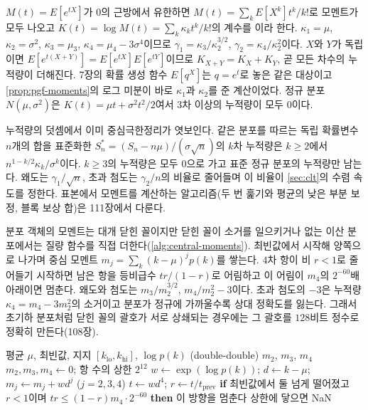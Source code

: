  $M(t)=E[e^{tX}]$가 $0$의 근방에서 유한하면 $M(t)=\sum_kE[X^k]t^k/k!$로 모멘트가 모두 나오고 $K(t)=\log M(t)=\sum_k\kappa_kt^k/k!$의 계수를 이라 한다. $\kappa_1=\mu$, $\kappa_2=\sigma^2$, $\kappa_3=\mu_3$, $\kappa_4=\mu_4-3\sigma^4$이므로 $\gamma_1=\kappa_3/\kappa_2^{3/2}$, $\gamma_2=\kappa_4/\kappa_2^2$이다. $X$와 $Y$가 독립이면 $E[e^{t(X+Y)}]=E[e^{tX}]E[e^{tY}]$이므로 $K_{X+Y}=K_X+K_Y$, 곧 모든 차수의 누적량이 더해진다. 7장의 확률 생성 함수 $E[q^X]$는 $q=e^t$로 놓은 같은 대상이고 \cref{prop:pgf-moments}의 로그 미분이 바로 $\kappa_1$과 $\kappa_2$를 준 계산이었다. 정규 분포 $N(\mu,\sigma^2)$은 $K(t)=\mu t+\sigma^2t^2/2$여서 $3$차 이상의 누적량이 모두 $0$이다.

누적량의 덧셈에서 이미 중심극한정리가 엿보인다. 같은 분포를 따르는 독립 확률변수 $n$개의 합을 표준화한 $S_n^\ast=(S_n-n\mu)/(\sigma\sqrt n)$의 $k$차 누적량은 $k\ge2$에서 $n^{1-k/2}\kappa_k/\sigma^k$이다. $k\ge3$의 누적량은 모두 $0$으로 가고 표준 정규 분포의 누적량만 남는다. 왜도는 $\gamma_1/\sqrt n$, 초과 첨도는 $\gamma_2/n$의 비율로 줄어들며 이 비율이 \cref{sec:clt}의 수렴 속도를 정한다. 표본에서 모멘트를 계산하는 알고리즘(두 번 훑기와 평균의 낮은 부분 보정, 블록 보상 합)은 111장에서 다룬다.

분포 객체의 모멘트는 대개 닫힌 꼴이지만 닫힌 꼴이 소거를 일으키거나 없는 이산 분포에서는 질량 함수를 직접 더한다(\cref{alg:central-moments}). 최빈값에서 시작해 양쪽으로 나가며 중심 모멘트 $m_j=\sum_k(k-\mu)^jp(k)$를 쌓는다. $4$차 항이 비 $r<1$로 줄어들기 시작하면 남은 항을 등비급수 $tr/(1-r)$로 어림하고 이 어림이 $m_4$의 $2^{-60}$배 아래이면 멈춘다. 왜도와 첨도는 $m_3/m_2^{3/2}$, $m_4/m_2^2-3$이다. 초과 첨도의 $-3$은 누적량 $\kappa_4=m_4-3m_2^2$의 소거이고 분포가 정규에 가까울수록 상대 정확도를 잃는다. 그래서 초기하 분포처럼 닫힌 꼴의 괄호가 서로 상쇄되는 경우에는 그 괄호를 $128$비트 정수로 정확히 만든다(108장).

\begin{algorithm}[htbp]
\begin{algorithmic}[1]
\Require 평균 $\mu$, 최빈값, 지지 $[k_{\mathrm{lo}},k_{\mathrm{hi}}]$, $\log p(k)$ (double-double)
\Ensure $m_2$, $m_3$, $m_4$
\State $m_2,m_3,m_4\gets0$; 항 수의 상한 $2^{12}$
  \State $w\gets\exp(\log p(k))$; $d\gets k-\mu$; $m_j\gets m_j+wd^j$ ($j=2,3,4$)
  \State $t\gets wd^4$; $r\gets t/t_{\mathrm{prev}}$
  \State \textbf{if} 최빈값에서 둘 넘게 떨어졌고 $r<1$이며 $tr\le(1-r)m_4\cdot2^{-60}$ \textbf{then} 이 방향을 멈춘다
\EndFor
\State 상한에 닿으면 NaN 
\end{algorithmic}
\caption{이산 분포의 중심 모멘트 (stardust 의 )}
\label{alg:central-moments}
\end{algorithm}

